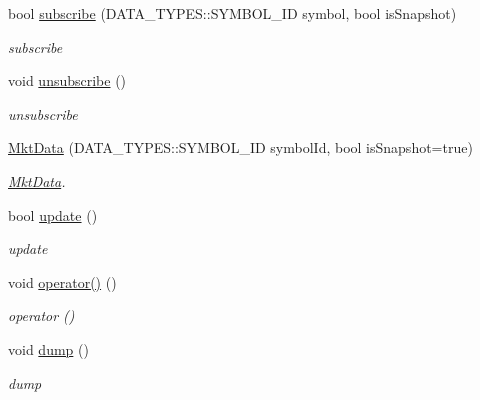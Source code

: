 \begin{DoxyCompactItemize}
bool \hyperlink{class_a_p_i2_1_1_c_o_m_m_o_n_1_1_mkt_data_a10582f954576088dd45580b7aef78a32}{subscribe} (D\-A\-T\-A\-\_\-\-T\-Y\-P\-E\-S\-::\-S\-Y\-M\-B\-O\-L\-\_\-\-I\-D symbol, bool is\-Snapshot)
\begin{DoxyCompactList}\small\item\em subscribe \end{DoxyCompactList}\item 
\hypertarget{class_a_p_i2_1_1_c_o_m_m_o_n_1_1_mkt_data_a7f5dceb2456e460d7c21604985e1eecd}{void \hyperlink{class_a_p_i2_1_1_c_o_m_m_o_n_1_1_mkt_data_a7f5dceb2456e460d7c21604985e1eecd}{unsubscribe} ()}\label{class_a_p_i2_1_1_c_o_m_m_o_n_1_1_mkt_data_a7f5dceb2456e460d7c21604985e1eecd}

\begin{DoxyCompactList}\small\item\em unsubscribe \end{DoxyCompactList}\item 
\hyperlink{class_a_p_i2_1_1_c_o_m_m_o_n_1_1_mkt_data_a794cd4472c438d19b21f93d610295508}{Mkt\-Data} (D\-A\-T\-A\-\_\-\-T\-Y\-P\-E\-S\-::\-S\-Y\-M\-B\-O\-L\-\_\-\-I\-D symbol\-Id, bool is\-Snapshot=true)
\begin{DoxyCompactList}\small\item\em \hyperlink{class_a_p_i2_1_1_c_o_m_m_o_n_1_1_mkt_data}{Mkt\-Data}. \end{DoxyCompactList}\item 
bool \hyperlink{class_a_p_i2_1_1_c_o_m_m_o_n_1_1_mkt_data_a052019c5bc3e099d4806c3f666d855e0}{update} ()
\begin{DoxyCompactList}\small\item\em update \end{DoxyCompactList}\item 
\hypertarget{class_a_p_i2_1_1_c_o_m_m_o_n_1_1_mkt_data_a8dc2f4c75526506d70d3149a5212d17f}{void \hyperlink{class_a_p_i2_1_1_c_o_m_m_o_n_1_1_mkt_data_a8dc2f4c75526506d70d3149a5212d17f}{operator()} ()}\label{class_a_p_i2_1_1_c_o_m_m_o_n_1_1_mkt_data_a8dc2f4c75526506d70d3149a5212d17f}

\begin{DoxyCompactList}\small\item\em operator () \end{DoxyCompactList}\item 
\hypertarget{class_a_p_i2_1_1_c_o_m_m_o_n_1_1_mkt_data_aefb6ba524d176aa2a87adfdae54b6c85}{void \hyperlink{class_a_p_i2_1_1_c_o_m_m_o_n_1_1_mkt_data_aefb6ba524d176aa2a87adfdae54b6c85}{dump} ()}\label{class_a_p_i2_1_1_c_o_m_m_o_n_1_1_mkt_data_aefb6ba524d176aa2a87adfdae54b6c85}

\begin{DoxyCompactList}\small\item\em dump \end{DoxyCompactList}\end{DoxyCompactItemize}


